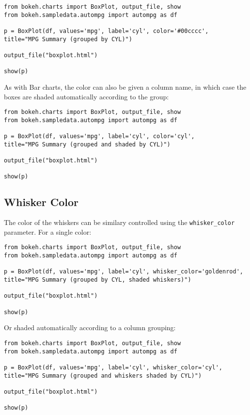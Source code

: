\documentclass[a4paper,12pt]{article}
\begin{document}
\begin{framed}
	\begin{verbatim}
from bokeh.charts import BoxPlot, output_file, show
from bokeh.sampledata.autompg import autompg as df

p = BoxPlot(df, values='mpg', label='cyl', color='#00cccc',
title="MPG Summary (grouped by CYL)")

output_file("boxplot.html")

show(p)
\end{verbatim}
\end{framed}
As with Bar charts, the color can also be given a column name, in which case the boxes are shaded automatically according to the group:
\begin{framed}
	\begin{verbatim}
from bokeh.charts import BoxPlot, output_file, show
from bokeh.sampledata.autompg import autompg as df

p = BoxPlot(df, values='mpg', label='cyl', color='cyl',
title="MPG Summary (grouped and shaded by CYL)")

output_file("boxplot.html")

show(p)
\end{verbatim}
\end{framed}
\subsection{Whisker Color}
The color of the whiskers can be similary controlled using the \texttt{whisker\_color} parameter. For a single color:
\begin{framed}
\begin{verbatim}
from bokeh.charts import BoxPlot, output_file, show
from bokeh.sampledata.autompg import autompg as df

p = BoxPlot(df, values='mpg', label='cyl', whisker_color='goldenrod',
title="MPG Summary (grouped by CYL, shaded whiskers)")

output_file("boxplot.html")

show(p)
\end{verbatim}
\end{framed}
Or shaded automatically according to a column grouping:

\begin{framed}
\begin{verbatim}
from bokeh.charts import BoxPlot, output_file, show
from bokeh.sampledata.autompg import autompg as df

p = BoxPlot(df, values='mpg', label='cyl', whisker_color='cyl',
title="MPG Summary (grouped and whiskers shaded by CYL)")

output_file("boxplot.html")

show(p)
\end{verbatim}
\end{framed}
\newpage
\end{document}
